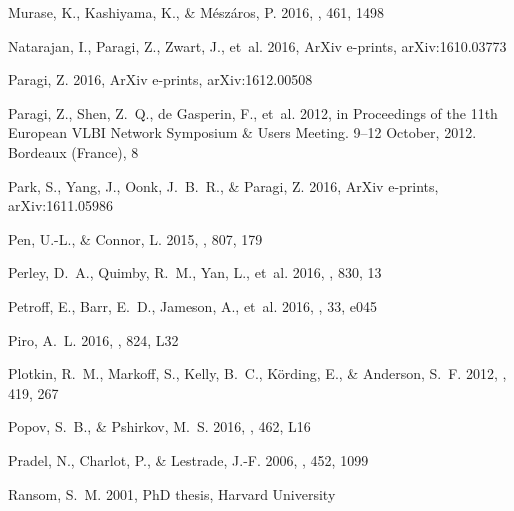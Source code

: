 \documentclass[twocolumn]{aastex61}
\begin{document}
\begin{thebibliography}{}
{Murase}, K., {Kashiyama}, K., \& {M{\'e}sz{\'a}ros}, P. 2016, \mnras, 461,
  1498

{Natarajan}, I., {Paragi}, Z., {Zwart}, J., {et~al.} 2016, ArXiv e-prints,
  arXiv:1610.03773

{Paragi}, Z. 2016, ArXiv e-prints, arXiv:1612.00508

{Paragi}, Z., {Shen}, Z.~Q., {de Gasperin}, F., {et~al.} 2012, in Proceedings
  of the 11th European VLBI Network Symposium \& Users Meeting. 9--12 October,
  2012. Bordeaux (France), 8

{Park}, S., {Yang}, J., {Oonk}, J.~B.~R., \& {Paragi}, Z. 2016, ArXiv e-prints,
  arXiv:1611.05986

{Pen}, U.-L., \& {Connor}, L. 2015, \apj, 807, 179

{Perley}, D.~A., {Quimby}, R.~M., {Yan}, L., {et~al.} 2016, \apj, 830, 13

{Petroff}, E., {Barr}, E.~D., {Jameson}, A., {et~al.} 2016, \pasa, 33, e045

{Piro}, A.~L. 2016, \apjl, 824, L32

{Plotkin}, R.~M., {Markoff}, S., {Kelly}, B.~C., {K{\"o}rding}, E., \&
  {Anderson}, S.~F. 2012, \mnras, 419, 267

{Popov}, S.~B., \& {Pshirkov}, M.~S. 2016, \mnras, 462, L16

{Pradel}, N., {Charlot}, P., \& {Lestrade}, J.-F. 2006, \aap, 452, 1099

{Ransom}, S.~M. 2001, PhD thesis, Harvard University


\end{thebibliography}
\end{document}
